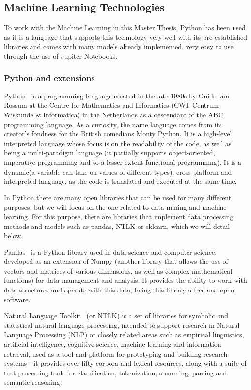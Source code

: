 \subsection{Machine Learning Technologies}
To work with the Machine Learning in this Master Thesis, Python has been used as it is a language that supports this technology very well with its pre-established libraries and comes with many models already implemented, very easy to use through the use of Jupiter Notebooks.

\subsubsection{Python and extensions}
Python~\cite{Welcomet44:online} is a programming language created in the late 1980s by Guido van Rossum at the Centre for Mathematics and Informatics (CWI, Centrum Wiskunde \& Informatica) in the Netherlands as a descendant of the ABC programming language. As a curiosity, the name language comes from its creator's fondness for the British comedians Monty Python. It is a high-level interpreted language whose focus is on the readability of the code, as well as being a multi-paradigm language (it partially supports object-oriented, imperative programming and to a lesser extent functional programming). It is a dynamic(a variable can take on values of different types), cross-platform and interpreted language, as the code is translated and executed at the same time.

In Python there are many open libraries that can be used for many different purposes, but we will focus on the one related to data mining and machine learning. For this purpose, there are libraries that implement data processing methods and models such as pandas, NTLK or sklearn, which we will detail below.

Pandas~\cite{pandasPy20:online} is a Python library used in data science and computer science, developed as an extension of Numpy (another library that allows the use of vectors and matrices of various dimensions, as well as complex mathematical functions) for data management and analysis. It provides the ability to work with data structures and operate with this data, being this library a free and open software.

Natural Language Toolkit~\cite{NLTKNatu6:online} (or NTLK) is a set of libraries for symbolic and statistical natural language processing, intended to support research in Natural Language Processing (NLP) or closely related areas such as empirical linguistics, artificial intelligence, cognitive science, machine learning and information retrieval, used as a tool and platform for prototyping and building research systems - it provides over fifty corpora and lexical resources, along with a suite of text processing tools for classification, tokenization, stemming, parsing and semantic reasoning.

